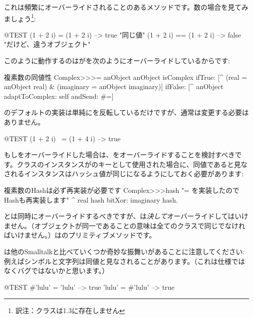 \documentclass[a4paper,10pt,twoside]{book}
\begin{document}
これは頻繁にオーバーライドされることのあるメソッドです。数の場合を見てみましょう\footnote{訳注：クラスは\pharo 1.3に存在しません}:

\begin{code}{@TEST}
(1 + 2 i) = (1 + 2 i)   --> true     "同じ値"
(1 + 2 i) == (1 + 2 i) --> false    "だけど、違うオブジェクト"
\end{code}

このように動作するのはが\ct{=}を次のようにオーバーライドしているからです:
\begin{method}{複素数の同値性}
Complex>>>= anObject
    anObject isComplex
        ifTrue: [^ (real = anObject real) & (imaginary = anObject imaginary)]
        ifFalse: [^ anObject adaptToComplex: self andSend: #=]
\end{method}

のデフォルトの実装は単純にを反転しているだけですが、通常は変更する必要はありません。

\begin{code}{@TEST}
(1 + 2 i) ~= (1 + 4 i) --> true
\end{code}

もし\ct{=}をオーバーライドした場合は、をオーバーライドすることを検討すべきです。クラスのインスタンスがのキーとして使用された場合に、同値であると見なされるインスタンスはハッシュ値が同じになるようにしておく必要があります:
\begin{method}{複素数のHashは必ず再実装が必要です}
Complex>>>hash
    "= を実装したのでHashも再実装します"
    ^ real hash bitXor: imaginary hash.
\end{method}

\ct{=}とは同時にオーバーライドするべきですが、\ct{==}は\emph{決して}オーバーライドしてはいけません。（オブジェクトが同一であることの意味は全てのクラスで同じでなければいけません。）\ct{==}はのプリミティブメソッドです。

\pharo は他のSmalltalkと比べていくつか奇妙な振舞いがあることに注意してください: 例えばシンボルと文字列は同値と見なされることがあります。（これは仕様ではなくバグではないかと思います。）

\begin{code}{@TEST}
#'lulu' = 'lulu' --> true
'lulu' = #'lulu' --> true
\end{code}
\end{document}
